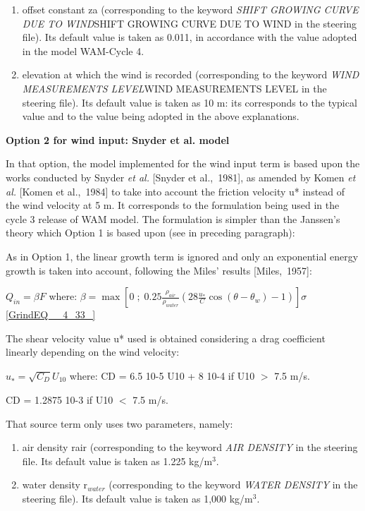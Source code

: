 \begin{enumerate}
\item  offset constant za (corresponding to the keyword \textit{SHIFT GROWING CURVE DUE TO WIND}SHIFT GROWING CURVE DUE TO WIND\textit{ }in the steering file). Its default value is taken as 0.011, in accordance with the value adopted in the model WAM-Cycle 4.

\item  elevation at which the wind is recorded (corresponding to the keyword \textit{WIND MEASUREMENTS LEVEL}WIND MEASUREMENTS LEVEL\textit{ }in the steering file). Its default value is taken as 10 m: its corresponds to the typical value and to the value being adopted in the above explanations.
\end{enumerate}


{\bf  Option 2 for wind input: Snyder et al. model}

 In that option, the model implemented for the wind input term is based upon the works conducted by Snyder \textit{et al.} [Snyder et al.,~1981], as amended by Komen \textit{et al.} [Komen et al.,~1984] to take into account the friction velocity u* instead of the wind velocity at 5 m. It corresponds to the formulation being used in the cycle 3 release of WAM model. The formulation is simpler than the Janssen's theory which Option 1 is based upon (see in preceding paragraph):

 As in Option 1, the linear growth term is ignored and only an exponential energy growth is taken into account, following the Miles' results [Miles,~1957]:

$Q_{in} =\beta F$    where:  $\beta =\max \left[0\; ;\; 0.25\frac{\rho _{air} }{\rho _{water} } \left(28\frac{u_{*} }{C} \cos (\theta -\theta _{w} )-1\right)\right]\sigma $ \eqref{GrindEQ__4_33_}

 The shear velocity value u* used is obtained considering a drag coefficient linearly depending on the wind velocity:

$u_{*}^{} =\sqrt{C_{D} } U_{10} $ where:  CD = 6.5 10-5 U10 + 8 10-4 if U10 $>$ 7.5 m/s.

 CD = 1.2875 10-3 if U10 $<$ 7.5 m/s.

That source term only uses two parameters, namely:

\begin{enumerate}
\item  air density rair (corresponding to the keyword \textit{AIR DENSITY} in the steering file. Its default value is taken as 1.225 kg/m${}^{3}$.

\item  water density r${}_{water}$ (corresponding to the keyword \textit{WATER DENSITY} in the steering file). Its default value is taken as 1,000 kg/m${}^{3}$.
\end{enumerate}


